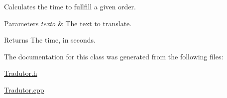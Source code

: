 Calculates the time to fullfill a given order. 


\begin{DoxyParams}{Parameters}
{\em texto} & The text to translate. \\
\hline
\end{DoxyParams}
\begin{DoxyReturn}{Returns}
The time, in seconds. 
\end{DoxyReturn}


The documentation for this class was generated from the following files\-:\begin{DoxyCompactItemize}
\item 
\hyperlink{_tradutor_8h}{Tradutor.\-h}\item 
\hyperlink{_tradutor_8cpp}{Tradutor.\-cpp}\end{DoxyCompactItemize}
